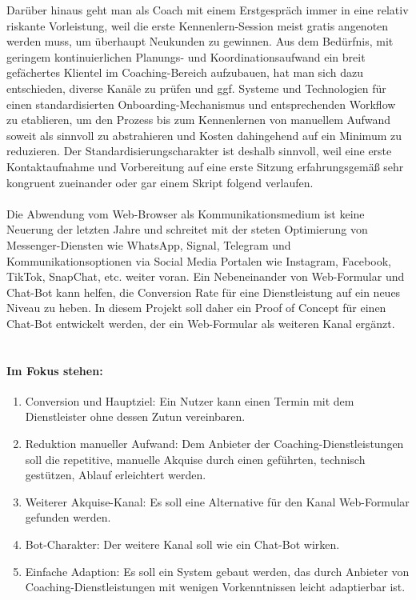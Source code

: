     Darüber hinaus geht man als Coach mit einem Erstgespräch immer in eine relativ riskante Vorleistung, weil die erste Kennenlern-Session meist gratis angenoten werden muss, um überhaupt Neukunden zu gewinnen. 
    Aus dem Bedürfnis, mit geringem kontinuierlichen Planungs- und Koordinationsaufwand ein breit gefächertes Klientel im Coaching-Bereich aufzubauen, hat man sich dazu entschieden, diverse Kanäle zu prüfen und ggf. Systeme und Technologien für einen standardisierten Onboarding-Mechanismus und entsprechenden Workflow zu etablieren, um den Prozess bis zum Kennenlernen von manuellem Aufwand soweit als sinnvoll zu abstrahieren und Kosten dahingehend auf ein Minimum zu reduzieren. Der Standardisierungscharakter ist deshalb sinnvoll, weil eine erste Kontaktaufnahme und Vorbereitung auf eine erste Sitzung erfahrungsgemäß sehr kongruent zueinander oder gar einem Skript folgend verlaufen. \\
    \\
    Die Abwendung vom Web-Browser als Kommunikationsmedium ist keine Neuerung der letzten Jahre und schreitet mit der steten Optimierung von Messenger-Diensten wie WhatsApp, Signal, Telegram und Kommunikationsoptionen via Social Media Portalen wie Instagram, Facebook, TikTok, SnapChat, etc. weiter voran. Ein Nebeneinander von Web-Formular und Chat-Bot kann helfen, die Conversion Rate für eine Dienstleistung auf ein neues Niveau zu heben. \cite{conversion} In diesem Projekt soll daher ein Proof of Concept für einen Chat-Bot entwickelt werden, der ein Web-Formular als weiteren Kanal ergänzt.\\ 
    \\ 
    \paragraph{Im Fokus stehen:}
    \begin{enumerate}
        \item Conversion und Hauptziel: Ein Nutzer kann einen Termin mit dem Dienstleister ohne dessen Zutun vereinbaren.
        \item Reduktion manueller Aufwand: Dem Anbieter der Coaching-Dienstleistungen soll die repetitive, manuelle Akquise durch einen geführten, technisch gestützen, Ablauf erleichtert werden. 
        \item Weiterer Akquise-Kanal: Es soll eine Alternative für den Kanal Web-Formular gefunden werden. 
        \item Bot-Charakter: Der weitere Kanal soll wie ein Chat-Bot wirken.
        \item Einfache Adaption: Es soll ein System gebaut werden, das durch Anbieter von Coaching-Dienstleistungen mit wenigen Vorkenntnissen leicht adaptierbar ist.
    \end{enumerate}
    

